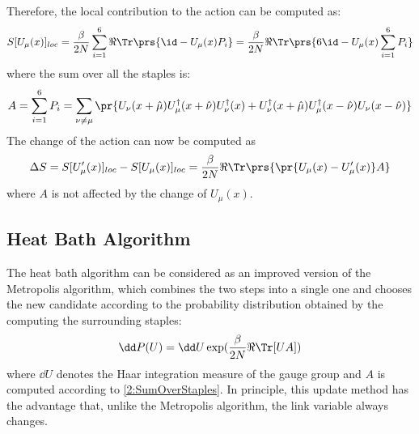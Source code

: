 Therefore, the local contribution to the action can be computed as:
\begin{equation*}
    S[U_\mu(x)]_{loc} = \frac\beta{2N} \sum_{i=1}^6 \Re\Tr\prs{\id-U_\mu(x)P_i} = \frac\beta{2N} \Re\Tr\prs{6\id-U_\mu(x)\sum_{i=1}^6P_i}
\end{equation*}
where the sum over all the staples is:
\begin{equation}
    A = \sum_{i=1}^6P_i = \sum_{\nu\neq\mu}\pr{U_\nu(x+\hat\mu)U^\dagger_\mu(x+\hat\nu)U^\dagger_\nu(x) + U^\dagger_\nu(x+\hat\mu)U^\dagger_\mu(x-\hat\nu)U_\nu(x-\hat\nu)} \label{2:SumOverStaples}
\end{equation}
The change of the action can now be computed as
\begin{equation}
    \Delta S = S[U'_\mu(x)]_{loc}-S[U_\mu(x)]_{loc} = \frac\beta{2N} \Re\Tr\prs{\pr{U_\mu(x)-U'_\mu(x)}A} \label{2:MetropolisActionVar}
\end{equation}
where $A$ is not affected by the change of $U_\mu(x)$.

\subsection{Heat Bath Algorithm}
The heat bath algorithm can be considered as an improved version of the Metropolis algorithm, which combines the two steps into a single one and chooses the new candidate according to the probability distribution obtained by the computing the surrounding staples:
\begin{equation}
    \dd P(U) = \dd U \exp(\frac\beta{2N}\Re\Tr[U A]) \label{2:DistrProbHB}
\end{equation}
where $\dd U$ denotes the Haar integration measure of the gauge group and $A$ is computed according to \eqref{2:SumOverStaples}.
In principle, this update method 
has the advantage that, unlike the Metropolis algorithm, the link variable always changes.

